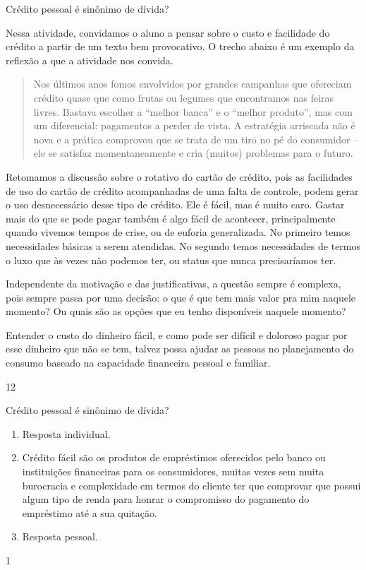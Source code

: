 \begin{sugestions}{Crédito pessoal é sinônimo de dívida?}
{Nessa atividade, convidamos o aluno a pensar sobre o custo e facilidade do crédito a partir de um texto bem provocativo. O trecho abaixo é um exemplo da reflexão a que a atividade nos convida.

\begin{quote}
Nos últimos anos fomos envolvidos por grandes campanhas que ofereciam crédito quase que como frutas ou legumes que encontramos nas feiras livres. Bastava escolher a “melhor banca” e o “melhor produto”, mas com um diferencial: pagamentos a perder de vista. A estratégia arriscada não é nova e a prática comprovou que se trata de um tiro no pé do consumidor – ele se satisfaz momentaneamente e cria (muitos) problemas para o futuro.
\end{quote}

Retomamos a discussão sobre o rotativo do cartão de crédito, pois as facilidades de uso do cartão de crédito acompanhadas de uma falta de controle, podem gerar o uso desnecessário desse tipo de crédito. Ele é fácil, mas é muito caro. Gastar mais do que se pode pagar também é algo fácil de acontecer, principalmente quando vivemos tempos de crise, ou de euforia generalizada. No primeiro temos necessidades básicas a serem atendidas. No segundo temos necessidades de termos o luxo que às vezes não podemos ter, ou status que nunca precisaríamos ter.

Independente da motivação e das justificativas, a questão sempre é complexa, pois sempre passa por uma decisão: o que é que tem mais valor pra mim naquele momento? Ou quais são as opções que eu tenho disponíveis naquele momento?

Entender o custo do dinheiro fácil, e como pode ser difícil e doloroso pagar por esse dinheiro que não se tem, talvez possa ajudar as pessoas no planejamento do consumo baseado na capacidade financeira pessoal e familiar.

}{1}{2}
\end{sugestions}
\begin{answer}{Crédito pessoal é sinônimo de dívida?}
{
\begin{enumerate}
\item Resposta individual.
\item Crédito fácil são os produtos de empréstimos oferecidos pelo banco ou instituições financeiras para os consumidores, muitas vezes sem muita burocracia e complexidade em termos do cliente ter que comprovar que possui algum tipo de renda para honrar o compromisso do pagamento do empréstimo até a sua quitação.
\item Resposta pessoal.
\end{enumerate}
}{1}
\end{answer}

